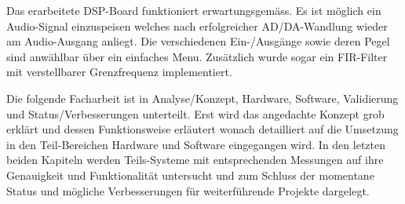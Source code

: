 Das erarbeitete DSP-Board funktioniert erwartungsgemäss. Es ist möglich ein Audio-Signal einzuspeisen welches nach erfolgreicher AD/DA-Wandlung wieder am Audio-Ausgang anliegt. Die verschiedenen Ein-/Ausgänge sowie deren Pegel sind anwählbar über ein einfaches Menu. Zusätzlich wurde sogar ein FIR-Filter mit verstellbarer Grenzfrequenz implementiert.


Die folgende Facharbeit ist in Analyse/Konzept, Hardware, Software, Validierung und Status/Verbesserungen unterteilt. Erst wird das angedachte Konzept grob erklärt und dessen Funktionsweise erläutert wonach detailliert auf die Umsetzung in den Teil-Bereichen Hardware und Software eingegangen wird. In den letzten beiden Kapiteln werden Teils-Systeme mit entsprechenden Messungen auf ihre Genauigkeit und Funktionalität untersucht und zum Schluss der momentane Status und mögliche Verbesserungen für weiterführende Projekte dargelegt.

%
%
%
%
